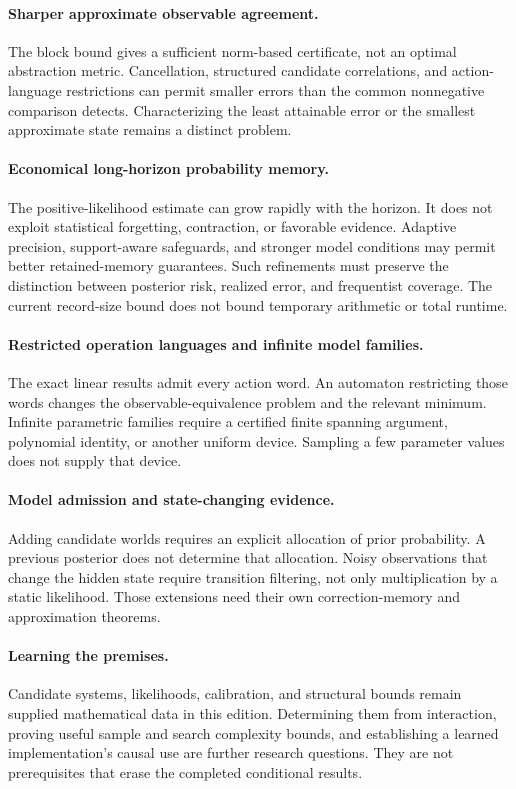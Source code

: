 \documentclass[11pt,letterpaper]{article}
\theoremstyle{plain}
\theoremstyle{definition}
\begin{document}
\paragraph{Sharper approximate observable agreement.} The block bound gives a sufficient norm-based certificate, not an optimal abstraction metric. Cancellation, structured candidate correlations, and action-language restrictions can permit smaller errors than the common nonnegative comparison detects. Characterizing the least attainable error or the smallest approximate state remains a distinct problem.

\paragraph{Economical long-horizon probability memory.} The positive-likelihood estimate can grow rapidly with the horizon. It does not exploit statistical forgetting, contraction, or favorable evidence. Adaptive precision, support-aware safeguards, and stronger model conditions may permit better retained-memory guarantees. Such refinements must preserve the distinction between posterior risk, realized error, and frequentist coverage. The current record-size bound does not bound temporary arithmetic or total runtime.

\paragraph{Restricted operation languages and infinite model families.} The exact linear results admit every action word. An automaton restricting those words changes the observable-equivalence problem and the relevant minimum. Infinite parametric families require a certified finite spanning argument, polynomial identity, or another uniform device. Sampling a few parameter values does not supply that device.

\paragraph{Model admission and state-changing evidence.} Adding candidate worlds requires an explicit allocation of prior probability. A previous posterior does not determine that allocation. Noisy observations that change the hidden state require transition filtering, not only multiplication by a static likelihood. Those extensions need their own correction-memory and approximation theorems.

\paragraph{Learning the premises.} Candidate systems, likelihoods, calibration, and structural bounds remain supplied mathematical data in this edition. Determining them from interaction, proving useful sample and search complexity bounds, and establishing a learned implementation's causal use are further research questions. They are not prerequisites that erase the completed conditional results.
\end{document}
